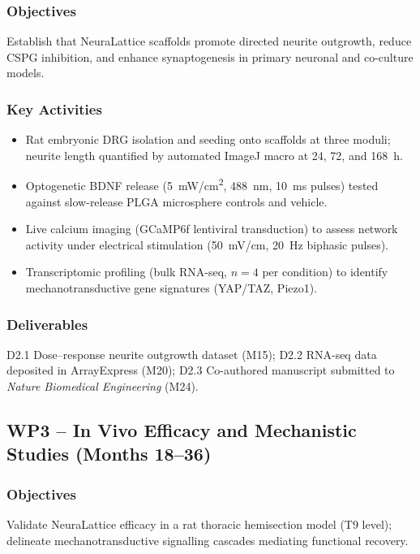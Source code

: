 \documentclass[11pt,a4paper]{article}
\begin{document}
\subsubsection{Objectives}
Establish that NeuraLattice scaffolds promote directed neurite outgrowth, reduce CSPG
inhibition, and enhance synaptogenesis in primary neuronal and co-culture models.

\subsubsection{Key Activities}
\begin{itemize}
  \item Rat embryonic DRG isolation and seeding onto scaffolds at three moduli;
    neurite length quantified by automated ImageJ macro at 24, 72, and 168~h.
  \item Optogenetic BDNF release (5~mW/cm\textsuperscript{2}, 488~nm, 10~ms pulses)
    tested against slow-release PLGA microsphere controls and vehicle.
  \item Live calcium imaging (GCaMP6f lentiviral transduction) to assess network
    activity under electrical stimulation (50~mV/cm, 20~Hz biphasic pulses).
  \item Transcriptomic profiling (bulk RNA-seq, $n = 4$ per condition) to identify
    mechanotransductive gene signatures (YAP/TAZ, Piezo1).
\end{itemize}

\subsubsection{Deliverables}
D2.1 Dose--response neurite outgrowth dataset (M15); D2.2 RNA-seq data deposited in
ArrayExpress (M20); D2.3 Co-authored manuscript submitted to \textit{Nature Biomedical
Engineering} (M24).

\subsection{WP3 -- In Vivo Efficacy and Mechanistic Studies (Months 18--36)}

\subsubsection{Objectives}
Validate NeuraLattice efficacy in a rat thoracic hemisection model (T9 level);
delineate mechanotransductive signalling cascades mediating functional recovery.
\end{document}
